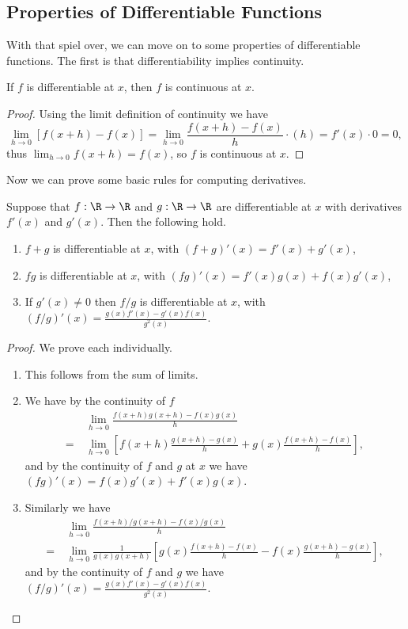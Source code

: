 \subsection{Properties of Differentiable Functions}

With that spiel over, we can move on to some properties of differentiable functions. The first is that differentiability implies continuity.

\begin{proposition}
	If $f$ is differentiable at $x$, then $f$ is continuous at $x$.
\end{proposition}
\begin{proof}
	Using the limit definition of continuity we have
	$$\lim_{h \to 0} \left[f(x + h) - f(x)\right] = \lim_{h \to 0} \frac{f(x + h) - f(x)}{h} \cdot (h) = f'(x) \cdot 0 = 0,
	$$
	thus $\lim_{h \to 0} f(x + h) = f(x)$, so $f$ is continuous at $x$.
\end{proof}

Now we can prove some basic rules for computing derivatives.

\begin{proposition}
	Suppose that $f: \R \rightarrow \R$ and $g: \R \rightarrow \R$ are differentiable at $x$ with derivatives $f'(x)$ and $g'(x)$.
	Then the following hold.
	\begin{enumerate}[label=(\roman*)]
		\item $f + g$ is differentiable at $x$, with $(f + g)'(x)= f'(x) + g'(x)$,
		\item $fg$ is differentiable at $x$, with $(fg)'(x) = f'(x)g(x) + f(x)g'(x)$,
		\item If $g'(x) \neq 0$ then $f/g$ is differentiable at $x$, with $(f/g)'(x) = \frac{g(x)f'(x) - g'(x)f(x)}{g^2(x)}$.
	\end{enumerate}
\end{proposition}
\begin{proof}
	We prove each individually.
	\begin{enumerate}[label=(\roman*)]
		\item This follows from the sum of limits.
		\item We have by the continuity of $f$
		\begin{align*}
			&\lim_{h \to 0} \frac{f(x + h)g(x + h) - f(x)g(x)}{h} \\
			=\ &\lim_{h \to 0}\left[ f(x+h) \frac{g(x + h) - g(x)}{h} + g(x)\frac{f(x + h) - f(x)}{h}\right],
		\end{align*}
		and by the continuity of $f$ and $g$ at $x$ we have $(fg)'(x) = f(x)g'(x) + f'(x) g(x)$.
		\item Similarly we have
		\begin{align*}
			&\lim_{h \to 0} \frac{f(x + h)/g(x + h) - f(x)/g(x)}{h} \\
		=\ &\lim_{h \to 0} \frac{1}{g(x)g(x + h)} \left[g(x)\frac{f(x + h) - f(x)}{h} - f(x) \frac{g(x + h) - g(x)}{h}\right],
		\end{align*}
		and by the continuity of $f$ and $g$ we have $(f/g)'(x) = \frac{g(x)f'(x) - g'(x)f(x)}{g^2(x)}$. \qedhere
	\end{enumerate}
\end{proof}


